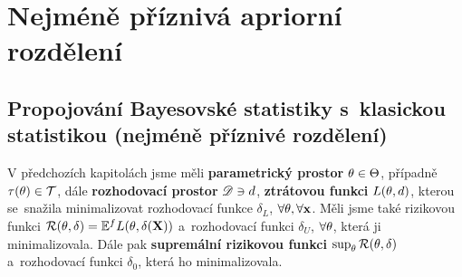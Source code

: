 \chapter{Nejméně příznivá apriorní rozdělení}

\section{Propojování Bayesovské statistiky s~klasickou statistikou (nejméně příznivé rozdělení)}
V předchozích kapitolách jsme měli \textbf{parametrický prostor} $\theta\in\Theta$, případně $\tau(\theta)\in\mathcal{T}$, dále \textbf{rozhodovací prostor} $\mathscr{D}\ni d $, \textbf{ztrátovou funkci}  $L(\theta,d)$, kterou se~snažila minimalizovat rozhodovací funkce $\delta_L$, $\forall \theta,\forall \textbf{x}$. Měli jsme také rizikovou funkci $\mathcal{R}(\theta,\delta)=\mathbb{E}^fL(\theta,\delta(\textbf{X}))$ a~rozhodovací funkci $\delta_U$, $\forall\theta$, která ji minimalizovala. Dále pak \textbf{supremální rizikovou funkci} $\sup_\theta\mathcal{R}(\theta,\delta)$ a~rozhodovací funkci $\delta_0$, která ho minimalizovala. 

